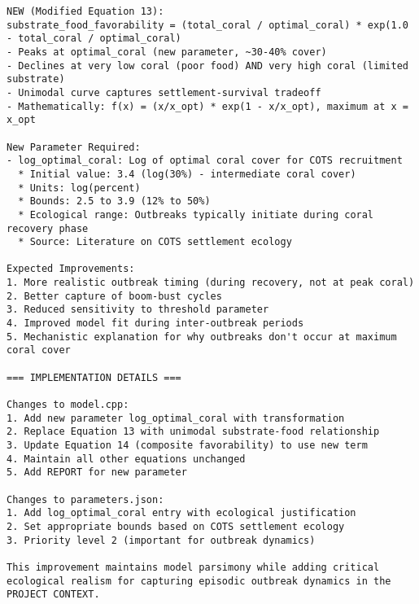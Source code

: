 \begin{lstlisting}
NEW (Modified Equation 13):
substrate_food_favorability = (total_coral / optimal_coral) * exp(1.0 - total_coral / optimal_coral)
- Peaks at optimal_coral (new parameter, ~30-40% cover)
- Declines at very low coral (poor food) AND very high coral (limited substrate)
- Unimodal curve captures settlement-survival tradeoff
- Mathematically: f(x) = (x/x_opt) * exp(1 - x/x_opt), maximum at x = x_opt

New Parameter Required:
- log_optimal_coral: Log of optimal coral cover for COTS recruitment
  * Initial value: 3.4 (log(30%) - intermediate coral cover)
  * Units: log(percent)
  * Bounds: 2.5 to 3.9 (12% to 50%)
  * Ecological range: Outbreaks typically initiate during coral recovery phase
  * Source: Literature on COTS settlement ecology

Expected Improvements:
1. More realistic outbreak timing (during recovery, not at peak coral)
2. Better capture of boom-bust cycles
3. Reduced sensitivity to threshold parameter
4. Improved model fit during inter-outbreak periods
5. Mechanistic explanation for why outbreaks don't occur at maximum coral cover

=== IMPLEMENTATION DETAILS ===

Changes to model.cpp:
1. Add new parameter log_optimal_coral with transformation
2. Replace Equation 13 with unimodal substrate-food relationship
3. Update Equation 14 (composite favorability) to use new term
4. Maintain all other equations unchanged
5. Add REPORT for new parameter

Changes to parameters.json:
1. Add log_optimal_coral entry with ecological justification
2. Set appropriate bounds based on COTS settlement ecology
3. Priority level 2 (important for outbreak dynamics)

This improvement maintains model parsimony while adding critical ecological realism for capturing episodic outbreak dynamics in the PROJECT CONTEXT.
\end{lstlisting}

